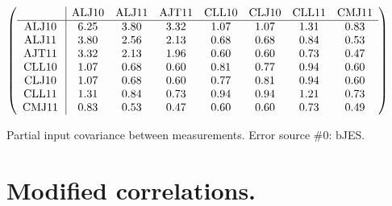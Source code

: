 \begin{table}[H]
\scriptsize
\begin{center}
\renewcommand{\arraystretch}{1.1}
\begin{math}\left(\begin{array}{c|ccccccc}
 & \mathrm{ALJ10} & 
\mathrm{ALJ11} & 
\mathrm{AJT11} & 
\mathrm{CLL10} & 
\mathrm{CLJ10} & 
\mathrm{CLL11} & 
\mathrm{CMJ11} \\
\hline
\mathrm{ALJ10} \hspace*{2pt} &       6.25 &       3.80 &       3.32 &       1.07 &       1.07 &       1.31 &       0.83 \\
\mathrm{ALJ11} \hspace*{2pt} &       3.80 &       2.56 &       2.13 &       0.68 &       0.68 &       0.84 &       0.53 \\
\mathrm{AJT11} \hspace*{2pt} &       3.32 &       2.13 &       1.96 &       0.60 &       0.60 &       0.73 &       0.47 \\
\mathrm{CLL10} \hspace*{2pt} &       1.07 &       0.68 &       0.60 &       0.81 &       0.77 &       0.94 &       0.60 \\
\mathrm{CLJ10} \hspace*{2pt} &       1.07 &       0.68 &       0.60 &       0.77 &       0.81 &       0.94 &       0.60 \\
\mathrm{CLL11} \hspace*{2pt} &       1.31 &       0.84 &       0.73 &       0.94 &       0.94 &       1.21 &       0.73 \\
\mathrm{CMJ11} \hspace*{2pt} &       0.83 &       0.53 &       0.47 &       0.60 &       0.60 &       0.73 &       0.49 \\
\end{array}\right)\end{math}
\caption{Partial input covariance between measurements. Error source \#0: bJES.}
\renewcommand{\arraystretch}{1}
\end{center}
\end{table}
\clearpage
\section{Modified correlations.}
